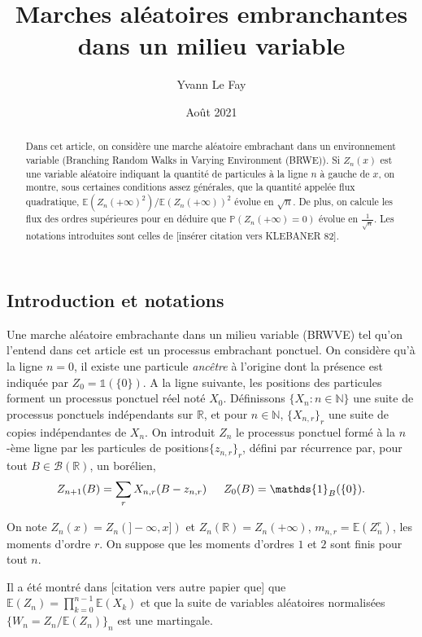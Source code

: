 \documentclass{article}
\theoremstyle{definition}
\begin{document}
\title{Marches aléatoires embranchantes dans un milieu variable}
\author{Yvann Le Fay}
\date{Août 2021}
\maketitle
\begin{abstract}
Dans cet article, on considère une marche aléatoire embrachant dans un environnement variable (Branching Random Walks in Varying Environment (BRWE)). Si $Z_n(x)$ est une variable aléatoire indiquant la quantité de particules à la ligne $n$ à gauche de $x$, on montre, sous certaines conditions assez générales, que la quantité appelée flux quadratique, $\mathds{E}(Z_n(+\infty)^2)/\mathds{E}(Z_n(+\infty))^2$ évolue en $\sqrt{n}$. De plus, on calcule les flux des ordres supérieures pour en déduire que $\mathds{P}(Z_n(+\infty)=0)$ évolue en $\frac{1}{\sqrt{n}}$. Les notations introduites sont celles de [insérer citation vers KLEBANER 82].
\end{abstract}
\subsection{Introduction et notations}
 Une marche aléatoire embrachante dans un milieu variable (BRWVE) tel qu'on l'entend dans cet article est un processus embrachant ponctuel. On considère qu'à la ligne $n = 0$, il existe une particule \textit{ancêtre} à l'origine dont la présence est indiquée par $Z_0 = \mathds{1}(\{0\})$. A la ligne suivante, les positions des particules forment un processus ponctuel réel noté $X_0$. Définissons $\{X_n : n\in\mathbb{N}\}$ une suite de processus ponctuels indépendants sur $\mathbb{R}$,  et pour $n\in\mathbb{N}$, $\{X_{n,r}\}_r$ une suite de copies indépendantes de $X_n$. On introduit $Z_n$ le processus ponctuel formé à la $n$-ème ligne par les particules de positions$\{z_{n,r}\}_r$, défini par récurrence par, pour tout $B\in\mathcal{B}(\mathbb{R})$, un borélien, 
\begin{align*}
Z_{n+1}(B) = \sum_{r} X_{n, r}(B-z_{n,r})\indent Z_0(B) = \mathds{1}_B(\{0\}).
\end{align*}

On note $Z_n(x) = Z_n(]-\infty, x])$ et $Z_n(\mathbb{R}) = Z_n(+\infty)$, $m_{n, r} = \mathbb{E}(Z_n^r)$, les moments d'ordre $r$. On suppose que les moments d'ordres $1$ et $2$ sont finis pour tout $n$.

Il a été montré dans [citation vers autre papier que] que $\mathbb{E}(Z_n) = \prod_{k=0}^{n-1}\mathbb{E}(X_k)$ et que la suite de variables aléatoires normalisées $\{W_n = Z_n/\mathbb{E}(Z_n)\}_n$ est une martingale.
\end{document}
